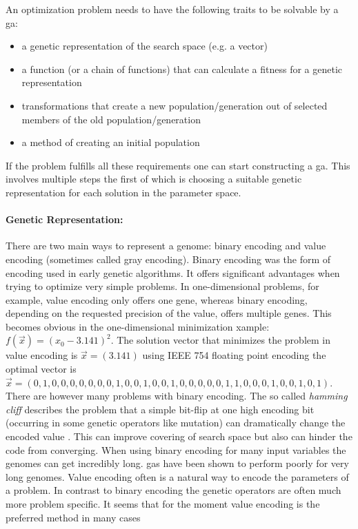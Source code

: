 An optimization problem needs to have the following traits to be solvable by a \gls{ga}:
\begin{itemize}
\item a genetic representation of the search space (e.g. a vector)
\item a function (or a chain of functions) that can calculate a fitness for a genetic representation
\item transformations that create a new population/generation out of selected members of the old population/generation
\item a method of creating an initial population
\end{itemize}


If the problem fulfills all these requirements one can start constructing a \gls{ga}. This involves multiple steps the first of which is choosing a suitable genetic representation for each solution in the parameter space. 

\paragraph{Genetic Representation:}
There are two main ways to represent a genome: binary encoding and value encoding (sometimes called gray encoding). Binary encoding was the form of encoding  used in early genetic algorithms. It offers significant advantages when trying to optimize very simple problems. In one-dimensional problems, for example, value encoding only offers one gene, whereas binary encoding, depending on the requested precision of the value, offers multiple genes. This becomes obvious in the one-dimensional minimization xample: $f(\vec{x})=(x_0 - 3.141)^2$. The solution vector that minimizes the problem in value encoding is $\vec{x} = (3.141)$ using IEEE 754 floating point encoding the optimal vector is $\vec{x}=(0,1,0,0,0,0,0,0,0,1,0,0,1,0,0,1,0,0,0,0,0,1,1,0,0,0,1,0,0,1,0,1)$.
There are however many problems with binary encoding. The so called \textit{hamming cliff} describes the problem that a simple bit-flip at one high encoding bit (occurring in some genetic operators like mutation) can dramatically change the encoded value \citep[e.g.][]{Chakraborty2003253}. This can improve covering of search space but also can hinder the code from converging. When using binary encoding for many input variables the genomes can get incredibly long. \glspl{ga} have been shown to perform poorly for very long genomes. Value encoding often is a natural way to encode the parameters of a problem. In contrast to binary encoding the genetic operators are often much more problem specific. It seems that for the moment value encoding is the preferred method in many cases \citep[e.g.][]{Janikow1991Comparison,Wright91geneticalgorithms,Goldberg90real-codedgenetic}

